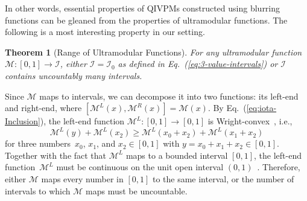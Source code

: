 \documentclass[english,reprint, aps, prl,superscriptaddress, showpacs,
showkeys, longbibliography, amsmath, amssymb, floatfix]{revtex4-1}
\theoremstyle{plain}
\newtheorem{thm}{Theorem}
\theoremstyle{definition}
\newcommand{\ultramodular}{\mathcal{M}}
\newcommand{\ultramodularL}[1][]{\ensuremath{\ultramodular^{L{#1}}}}
\newcommand{\ultramodularR}[1][]{\ensuremath{\ultramodular^{R{#1}}}}
\begin{document}
In other words, essential properties of QIVPMs constructed using
blurring functions can be gleaned from the properties of
ultramodular functions. The following is a most interesting property
in our setting. 

\begin{thm}[Range of Ultramodular Functions]\label{thm:convex-uncountable}For
any ultramodular function~$\ultramodular:\left[0,1\right]\rightarrow\mathscr{I}$,
either $\mathscr{I}=\mathscr{I}_{0}$ as defined in Eq.~(\ref{eq:3-value-intervals}) or
$\mathscr{I}$ contains uncountably many intervals.\end{thm}

Since $\ultramodular$ maps to intervals, we can decompose it into
two functions: its left-end and right-end, where
 $\left[\ultramodularL\left(x\right),\ultramodularR\left(x\right)\right]=\ultramodular\left(x\right)$.
By Eq.~(\ref{eq:iota-Inclusion}), the left-end function $\ultramodularL:\left[0,1\right]\rightarrow\left[0,1\right]$
is Wright-convex~\citep{Wright1954,RobertsVarberg1973,PecaricTong1992},
i.e., 
\[
\ultramodularL\left(y\right)+\ultramodularL\left(x_{2}\right)\ge\ultramodularL\left(x_{0}+x_{2}\right)+\ultramodularL\left(x_{1}+x_{2}\right)
\]
for three numbers~$x_{0}$, $x_{1}$, and $x_{2}\in\left[0,1\right]$ with
$y=x_{0}+x_{1}+x_{2}\in\left[0,1\right]$. 
Together with the fact that $\ultramodularL$ maps to a bounded
interval $\left[0,1\right]$, the left-end function~$\ultramodularL$
must be continuous on the unit open interval
$\left(0,1\right)$~\citep{MarinacciMontrucchio2005}.  Therefore,
either $\ultramodular$ maps every number in $\left[0,1\right]$ to the
same interval, or the number of intervals to which $\ultramodular$ maps
must be uncountable.
\end{document}
